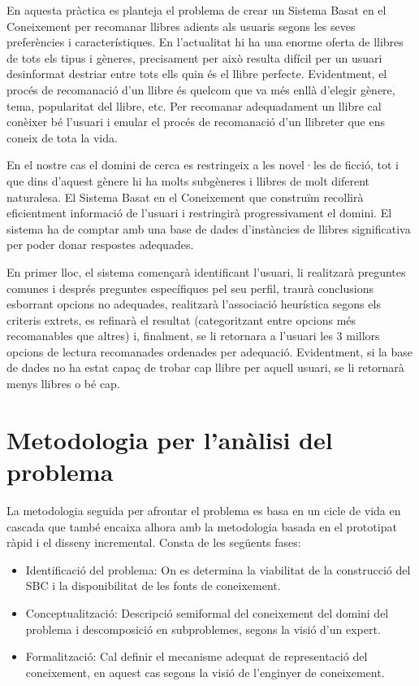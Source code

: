 
En aquesta pràctica es planteja el problema de crear un Sistema Basat en el Coneixement per recomanar llibres adients als usuaris segons les seves preferències i característiques. En l'actualitat hi ha una enorme oferta de llibres de tots els tipus i gèneres, precisament per això resulta difícil per un usuari desinformat destriar entre tots ells quin és el llibre perfecte. Evidentment, el procés de recomanació d'un llibre és quelcom que va més enllà d'elegir gènere, tema, popularitat del llibre, etc. Per recomanar adequadament un llibre cal conèixer bé l'usuari i emular el procés de recomanació d'un llibreter que ens coneix de tota la vida.

En el nostre cas el domini de cerca es restringeix a les novel·les de ficció, tot i que dins d'aquest gènere hi ha molts subgèneres i llibres de molt diferent naturalesa. El Sistema Basat en el Coneixement que construïm recollirà eficientment informació de l'usuari i restringirà progressivament el domini. El sistema ha de comptar amb una base de dades d'instàncies de llibres significativa per poder donar respostes adequades.

En primer lloc, el sistema començarà identificant l'usuari, li realitzarà preguntes comunes i després preguntes específiques pel seu perfil, traurà conclusions esborrant opcions no adequades, realitzarà l'associació heurística segons els criteris extrets, es refinarà el resultat (categoritzant entre opcions més recomanables que altres) i, finalment, se li retornara a l'usuari les 3 millors opcions de lectura recomanades ordenades per adequació. Evidentment, si la base de dades no ha estat capaç de trobar cap llibre per aquell usuari, se li retornarà menys llibres o bé cap.

\section{Metodologia per l'anàlisi del problema}

La metodologia seguida per afrontar el problema es basa en un cicle de vida en cascada que també encaixa alhora amb la metodologia basada en el prototipat ràpid i el disseny incremental. Consta de les següents fases:

\begin{itemize}
  \item Identificació del problema: On es determina la viabilitat de la construcció del SBC i la disponibilitat de les fonts de coneixement.
  \item Conceptualització: Descripció semiformal del coneixement del domini del problema i descomposició en subproblemes, segons la visió d'un expert.
  \item Formalització: Cal definir el mecanisme adequat de representació del coneixement, en aquest cas segons la visió de l'enginyer de coneixement.
\end{itemize}

